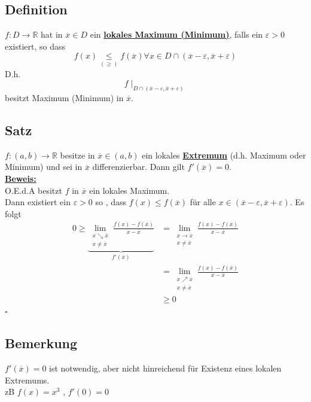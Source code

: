 \subsection{Definition} %
\label{sub:definition}
$f : D \to \mathds{R}$ hat in $\overline{x} \in D$ ein \underline{\textbf{lokales Maximum (Minimum)}}, falls ein $\varepsilon >0$ existiert, so dass 
\[
	f(x) \underset{(\ge)}{\le} f(\overline{x}) \forall x \in D \cap (\overline{x} - \varepsilon , \overline{x} + \varepsilon)
\]
D.h.
\[
	f \mid_{D \cap (\overline{x} - \varepsilon , \overline{x} + \varepsilon)}
\]
besitzt Maximum (Minimum) in $\overline{x}$.

\subsection{Satz} %
\label{sub:satz}
$f : (a,b) \to \mathds{R}$ besitze in $\overline{x} \in (a,b)$ ein lokales \textbf{\underline{Extremum}} (d.h. Maximum oder Minimum) und sei in $\overline{x}$
differenzierbar. Dann gilt $f'(\overline{x})=0$.
\vspace{10pt} \\
\underline{\textbf{Beweis:}} \\
O.E.d.A besitzt $f$ in $\overline{x}$ ein lokales Maximum. \\
Dann existiert ein $\varepsilon >0$ so , dass $f(x) \le f(\overline{x})$ für alle $x \in (\overline{x} - \varepsilon, \overline{x} + \varepsilon)$. Es folgt
\begin{align*}
	0 \ge \underbrace{\lim\limits_{\substack{x \searrow \overline{x} \\ x \not= \overline{x} }} \frac{f(x) - f(\overline{x})}{x - \overline{x}}}_{f'(\overline{x})} &= 
	\lim\limits_{\substack{x \to \overline{x} \\ x \not= \overline{x} }} \frac{f(x) - f(\overline{x})}{x - \overline{x}} \\
	&= \lim\limits_{\substack{x \nearrow \overline{x} \\ x \not= \overline{x} }} \frac{f(x) - f(\overline{x})}{x - \overline{x}} \\
	&\ge 0
\end{align*}
\hfill \( \square \)

\subsection{Bemerkung} %
\label{sub:bemerkung}
$f'(\overline{x})=0$ ist notwendig, aber nicht hinreichend für Existenz eines lokalen Extremums. \\
zB $f(x)= x^3$ , $f'(0)=0$

